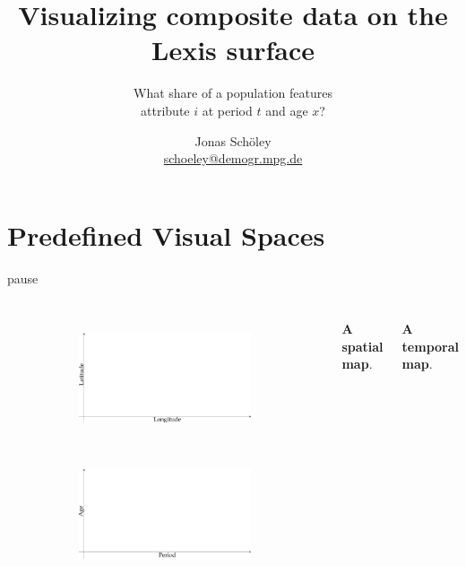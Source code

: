 \documentclass{beamer}
\title{Visualizing composite data on the Lexis surface}
\subtitle{What share of a population features\\attribute $i$ at period $t$ and age $x$?}
\author{Jonas Schöley\\\url{schoeley@demogr.mpg.de}}
\institute{\texttt{[image: ./misc/EDSDLogo.pdf]}}
\begin{document}
{
%
\begin{frame}[plain]
\titlepage
\end{frame}
}

\section{Predefined Visual Spaces} %


\begin{frame}{pause}
\frametitle{\insertsection}

\begin{columns}[c]

\begin{figure}[!htb]
\centering
\begin{subfigure}[c]{\textwidth}
\includegraphics[width = \textwidth]{../fig/plot-spatial_map_empty.pdf}
\end{subfigure}\\
\begin{subfigure}[c]{\textwidth}
\includegraphics[width = \textwidth]{../fig/plot-temporal_map_empty.pdf}
\end{subfigure}
\end{figure}

\footnotesize\textbf{A spatial map}.

\vspace{2.5cm}

\footnotesize\textbf{A temporal map}.

\end{columns}

\end{frame}
\end{document}
